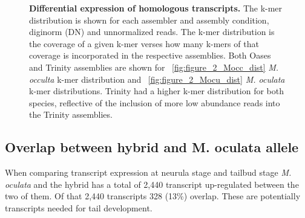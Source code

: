 \begin{figure}
{	}
	\caption{\textbf{Differential expression of homologous transcripts.} The k-mer distribution is shown for each assembler and assembly condition, diginorm (DN) and unnormalized reads. The k-mer distribution is the coverage of a given k-mer verses how many k-mers of that coverage is incorporated in the respective assemblies. Both Oases and Trinity assemblies are shown for ~\ref{fig:figure_2_Mocc_dist} \textit{M. occulta} k-mer distribution and  ~\ref{fig:figure_2_Mocu_dist} \textit{M. oculata} k-mer distributions. Trinity had a higher k-mer distribution for both species, reflective of the inclusion of more low abundance reads into the Trinity assemblies.}
	\label{fig:de_plots}
\end{figure}

\subsection{Overlap between hybrid and M. oculata allele }
When comparing transcript expression at neurula stage and tailbud stage \textit{M. oculata} and the hybrid has a total of 2,440 transcript up-regulated between the two of them. Of that 2,440 transcripts 328 (13\%) overlap. These are potentially transcripts needed for tail development. 

